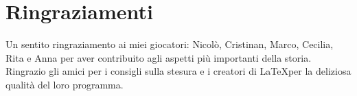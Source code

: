 
\begingroup
\let\clearpage\relax
\let\cleardoublepage\relax
\let\cleardoublepage\relax

\chapter*{Ringraziamenti}
Un sentito ringraziamento ai miei giocatori: Nicol\`o, Cristinan, Marco, Cecilia, Rita e Anna per aver contribuito agli aspetti pi\`u importanti della storia. Ringrazio gli amici per i consigli sulla stesura e i creatori di \LaTeX per la deliziosa qualit\`a del loro programma.
\endgroup



